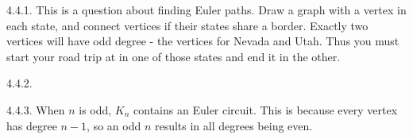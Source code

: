  \protect {} \protect \begin {itemize} 
\begin{ans}{4.4.1.}
		This is a question about finding Euler paths.  Draw a graph with a vertex in each state, and connect vertices if their states share a border.  Exactly two vertices will have odd degree - the vertices for Nevada and Utah.  Thus you must start your road trip at in one of those states and end it in the other. %
	
\end{ans}
\begin{ans}{4.4.2.}
	
\end{ans}
\begin{ans}{4.4.3.}
		When $n$ is odd, $K_n$ contains an Euler circuit.  This is because every vertex has degree $n-1$, so an odd $n$ results in all degrees being even.%
	

\end{ans}
\end{itemize}
